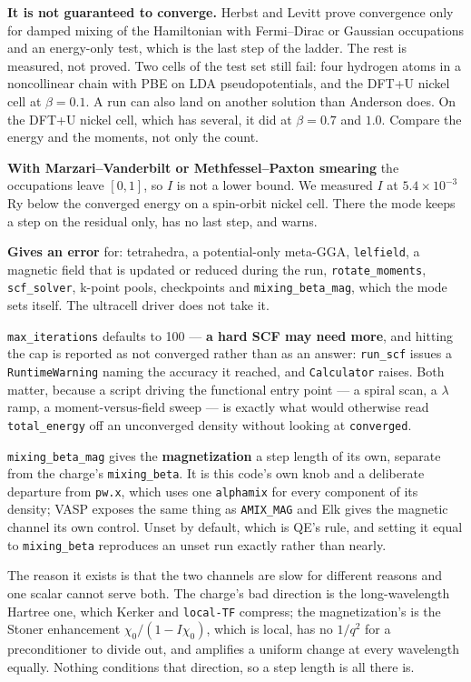 \documentclass[11pt,a4paper]{article}
\newcommand{\code}[1]{\texttt{\small #1}}
\begin{document}
\begin{refuses}
\textbf{It is not guaranteed to converge.} Herbst and Levitt prove convergence only
for damped mixing of the Hamiltonian with Fermi--Dirac or Gaussian occupations and an
energy-only test, which is the last step of the ladder. The rest is measured, not
proved. Two cells of the test set still fail: four hydrogen atoms in a noncollinear
chain with PBE on LDA pseudopotentials, and the DFT+U nickel cell at
$\beta = 0.1$. A run can also land on another solution than Anderson does. On the
DFT+U nickel cell, which has several, it did at $\beta = 0.7$ and $1.0$. Compare
the energy and the moments, not only the count.

\textbf{With Marzari--Vanderbilt or Methfessel--Paxton smearing} the occupations
leave $[0, 1]$, so $I$ is not a lower bound. We measured $I$ at $5.4\times10^{-3}$ Ry
below the converged energy on a spin-orbit nickel cell. There the mode keeps a step
on the residual only, has no last step, and warns.

\textbf{Gives an error} for: tetrahedra, a potential-only meta-GGA, \code{lelfield}, a
magnetic field that is updated or reduced during the run, \code{rotate\_moments},
\code{scf\_solver}, k-point pools, checkpoints and \code{mixing\_beta\_mag}, which the
mode sets itself. The ultracell driver does not take it.
\end{refuses}

\code{max\_iterations}
defaults to 100 --- \textbf{a hard SCF may need more}, and hitting the cap is
reported as not converged rather than as an answer: \code{run\_scf} issues a
\code{RuntimeWarning} naming the accuracy it reached, and \code{Calculator}
raises. Both matter, because a script driving the functional entry point --- a
spiral scan, a $\lambda$ ramp, a moment-versus-field sweep --- is exactly what
would otherwise read \code{total\_energy} off an unconverged density without
looking at \code{converged}.

\code{mixing\_beta\_mag} gives the \textbf{magnetization} a step length of its
own, separate from the charge's \code{mixing\_beta}. It is this code's own knob
and a deliberate departure from \code{pw.x}, which uses one \code{alphamix} for
every component of its density; VASP exposes the same thing as \code{AMIX\_MAG}
and Elk gives the magnetic channel its own control. Unset by default, which is
QE's rule, and setting it equal to \code{mixing\_beta} reproduces an unset run
exactly rather than nearly.

The reason it exists is that the two channels are slow for different reasons and
one scalar cannot serve both. The charge's bad direction is the long-wavelength
Hartree one, which Kerker and \code{local-TF} compress; the magnetization's is
the Stoner enhancement $\chi_0/(1 - I\chi_0)$, which is local, has no $1/q^2$
for a preconditioner to divide out, and amplifies a uniform change at every
wavelength equally. Nothing conditions that direction, so a step length is all
there is.
\end{document}

